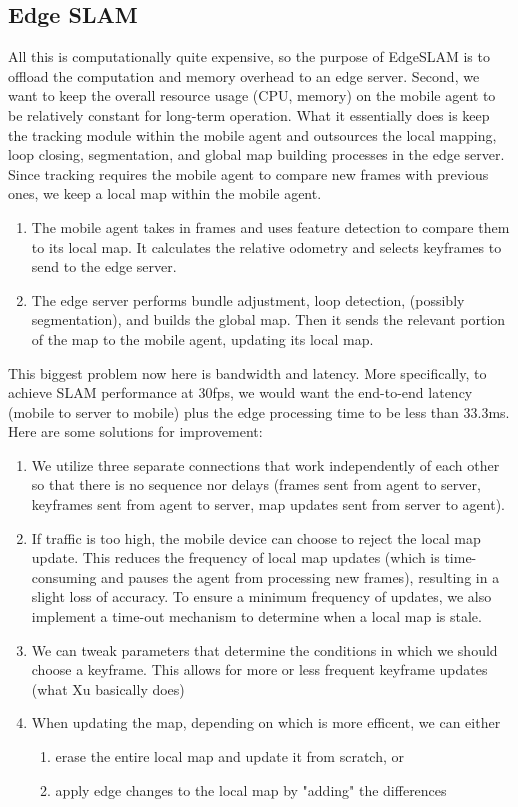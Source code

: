 \documentclass{article}
\theoremstyle{definition}
\theoremstyle{remark}
\theoremstyle{definition}
\begin{document}
\subsection{Edge SLAM}
All this is computationally quite expensive, so the purpose of EdgeSLAM is to offload the computation and memory overhead to an edge server. Second, we want to keep the overall resource usage (CPU, memory) on the mobile agent to be relatively constant for long-term operation. What it essentially does is keep the tracking module within the mobile agent and outsources the local mapping, loop closing, segmentation, and global map building processes in the edge server. Since tracking requires the mobile agent to compare new frames with previous ones, we keep a local map within the mobile agent. 
\begin{enumerate}
    \item The mobile agent takes in frames and uses feature detection to compare them to its local map. It calculates the relative odometry and selects keyframes to send to the edge server. 
    \item The edge server performs bundle adjustment, loop detection, (possibly segmentation), and builds the global map. Then it sends the relevant portion of the map to the mobile agent, updating its local map. 
\end{enumerate}
This biggest problem now here is bandwidth and latency. More specifically, to achieve SLAM performance at 30fps, we would want the end-to-end latency (mobile to server to mobile) plus the edge processing time to be less than 33.3ms. Here are some solutions for improvement: 
\begin{enumerate}
    \item We utilize three separate connections that work independently of each other so that there is no sequence nor delays (frames sent from agent to server, keyframes sent from agent to server, map updates sent from server to agent). 
    
    \item If traffic is too high, the mobile device can choose to reject the local map update. This reduces the frequency of local map updates (which is time-consuming and pauses the agent from processing new frames), resulting in a slight loss of accuracy. To ensure a minimum frequency of updates, we also implement a time-out mechanism to determine when a local map is stale. 
    
    \item We can tweak parameters that determine the conditions in which we should choose a keyframe. This allows for more or less frequent keyframe updates (what Xu basically does)
    
    \item When updating the map, depending on which is more efficent, we can either 
    \begin{enumerate}
        \item erase the entire local map and update it from scratch, or 
        \item apply edge changes to the local map by "adding" the differences
    \end{enumerate}
\end{enumerate}
\end{document}
